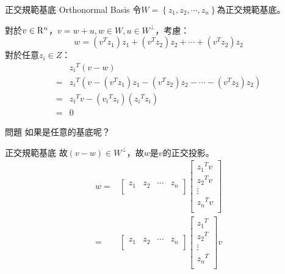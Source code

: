 \documentclass[14pt]{beamer}
\begin{document}
\begin{frame}{正交規範基底 Orthonormal Basis}
	令$\displaystyle W=\left\{ {{{z}_{1}},{{z}_{2}},\cdots ,{{z}_{n}}} \right\}$為正交規範基底。
	
	對於$v\in {{\rm{R}}^{n}}$，$v=w+u,w\in W,u\in {{W}^{\bot }}$，考慮：
	\[w=({{v}^{T}}{{z}_{1}}){{z}_{1}}+({{v}^{T}}{{z}_{2}}){{z}_{2}}+\cdots +({{v}^{T}}{{z}_{2}}){{z}_{2}}\]
	對於任意${{z}_{i}}\in Z$：
	\begin{align*}
	 & {{z}_{i}}^{T}(v-w)\\
	 = & {{z}_{i}}^{T}(v-({{v}^{T}}{{z}_{1}}){{z}_{1}}-({{v}^{T}}{{z}_{2}}){{z}_{2}}-\cdots -({{v}^{T}}{{z}_{2}}){{z}_{2}}) \\ 
	 = & {{z}_{i}}^{T}v-({{v}_{i}}^{T}{{z}_{i}})({{z}_{i}}^{T}{{z}_{i}}) \\ 
	 = & 0  
	\end{align*}
	\begin{exampleblock}{問題}
		如果是任意的基底呢？
	\end{exampleblock}
\end{frame}
\begin{frame}{正交規範基底}
	故$(v-w)\in {{W}^{\bot }}$，故$w$是$v$的正交投影。\\
	\begin{align*}
	w=&\left[ \begin{matrix}
	{{z}_{1}} & {{z}_{2}} & \cdots  & {{z}_{n}}  \\
	\end{matrix} \right]\left[ \begin{matrix}
	{{z}_{1}}^{T}v  \\
	{{z}_{2}}^{T}v  \\
	\vdots   \\
	{{z}_{n}}^{T}v  \\
	\end{matrix} \right]\\
	=&\left[ \begin{matrix}
	{{z}_{1}} & {{z}_{2}} & \cdots  & {{z}_{n}}  \\
	\end{matrix} \right]\left[ \begin{matrix}
	{{z}_{1}}^{T}  \\
	{{z}_{2}}^{T}  \\
	\vdots   \\
	{{z}_{n}}^{T}  \\
	\end{matrix} \right]v
	\end{align*}
 
	
\end{frame}
\end{document}
